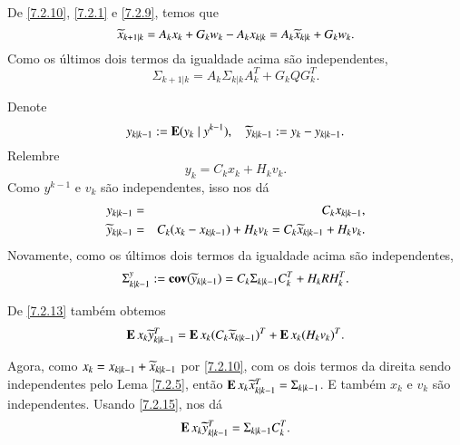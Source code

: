 De \eqref{7.2.10}, \eqref{7.2.1} e \eqref{7.2.9}, temos que
\[
\widetilde x_{k+1|k} = A_kx_k + G_kw_k-A_kx_{k|k} = A_k\widetilde x_{k|k}+G_kw_k.
\]
Como os últimos dois termos da igualdade acima são independentes,
\begin{equation}\label{7.2.11}
\Sigma_{k+1|k} = A_k\Sigma_{k|k}A_k^T + G_kQG_k^T.
\end{equation}




Denote
\begin{equation}\label{7.2.12}
y_{k|k-1} := \operatorname{\bf E}(y_k\;|\;y^{k-1}), \quad \widetilde y_{k|k-1}:= y_k-y_{k|k-1}.
\end{equation}
Relembre
\[
y_k=C_kx_k+H_kv_k.
\]
Como $y^{k-1}$ e $v_k$ são independentes, isso nos dá
\begin{eqnarray}\label{7.2.13}
y_{k|k-1} &=& C_kx_{k|k-1}, \nonumber\\
\widetilde y_{k|k-1} &=& C_k(x_k-x_{k|k-1}) + H_kv_k=C_k\widetilde x_{k|k-1}+H_kv_k.
\end{eqnarray}
Novamente, como os últimos dois termos da igualdade acima são independentes,
\begin{equation}\label{7.2.14}
\Sigma^y_{k|k-1} := \operatorname{\bf cov}(\widetilde y_{k|k-1})=C_k\Sigma_{k|k-1}C_k^T+H_kRH_k^T.
\end{equation}

De \eqref{7.2.13} também obtemos
\begin{equation}\label{7.2.15}
\operatorname{\bf E} x_k\widetilde y_{k|k-1}^T = \operatorname{\bf E} x_k(C_k\widetilde x_{k|k-1})^T + \operatorname{\bf E} x_k(H_kv_k)^T.
\end{equation}

Agora, como $x_k = x_{k|k-1}+\widetilde x_{k|k-1}$ por \eqref{7.2.10}, com os dois termos da direita sendo independentes pelo Lema \ref{7.2.5}, então $\operatorname{\bf E} x_k\widetilde x_{k|k-1}^T=\Sigma_{k|k-1}$. E também $x_k$ e $v_k$ são independentes. Usando  \eqref{7.2.15}, nos dá
\begin{equation}\label{7.2.16}
\operatorname{\bf E} x_k\widetilde y_{k|k-1}^T = \Sigma_{k|k-1}C_k^T.
\end{equation}


